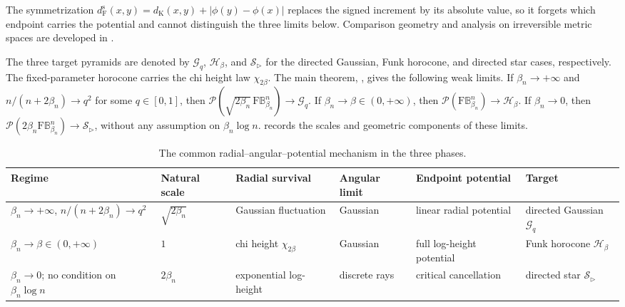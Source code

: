 \documentclass[10pt,a4paper]{amsart}
\numberwithin{equation}{section}
\newcommand{\BetaBall}{\mathrm F\mathbb B^n_{\beta_n}}
\newcommand{\Pyr}{\mathcal P}
\newcommand{\dF}{d_{\mathrm F}}
\newcommand{\dK}{d_{\mathrm K}}
\begin{document}
The symmetrization $\dF^{\mathrm s}(x,y)=\dK(x,y)+|\phi(y)-\phi(x)|$ replaces the signed increment by its absolute value, so it forgets which endpoint carries the potential and cannot distinguish the three limits below.  Comparison geometry and analysis on irreversible metric spaces are developed in \cite{ohta2021comparison,kristaly-zhao2022geometry,kristaly-ohta-zhao2025analysis}.

The three target pyramids are denoted by $\mathcal G_q$, $\mathcal H_\beta$, and $\mathcal S_{\rhd}$ for the directed Gaussian, Funk horocone, and directed star cases, respectively.  The fixed-parameter horocone carries the chi height law $\chi_{2\beta}$.  The main theorem, , gives the following weak limits.  If $\beta_n\to+\infty$ and $n/(n+2\beta_n)\to q^2$ for some $q\in[0,1]$, then $\Pyr(\sqrt{2\beta_n}\,\BetaBall)\to\mathcal G_q$.  If $\beta_n\to\beta\in(0,+\infty)$, then $\Pyr(\BetaBall)\to\mathcal H_\beta$.  If $\beta_n\to0$, then $\Pyr(2\beta_n\BetaBall)\to\mathcal S_{\rhd}$, without any assumption on $\beta_n\log n$.   records the scales and geometric components of these limits.

\begin{table}[ht]
\centering
\small
\setlength{\tabcolsep}{2pt}
\renewcommand{\arraystretch}{1.15}
\begin{tabular}{@{}p{}p{}p{}p{}p{}p{}@{}}
\toprule
\raggedright Regime & \raggedright Natural scale & \raggedright Radial survival & \raggedright Angular limit & \raggedright Endpoint potential & \raggedright Target \tabularnewline
\midrule
\raggedright $\beta_n\to+\infty$, $n/(n+2\beta_n)\to q^2$
& \raggedright $\sqrt{2\beta_n}$
& \raggedright Gaussian fluctuation
& \raggedright Gaussian
& \raggedright linear radial potential
& \raggedright directed Gaussian $\mathcal G_q$ \tabularnewline
\raggedright $\beta_n\to\beta\in(0,+\infty)$
& \raggedright $1$
& \raggedright chi height $\chi_{2\beta}$
& \raggedright Gaussian
& \raggedright full log-height potential
& \raggedright Funk horocone $\mathcal H_\beta$ \tabularnewline
\raggedright $\beta_n\to0$; no condition on $\beta_n\log n$
& \raggedright $2\beta_n$
& \raggedright exponential log-height
& \raggedright discrete rays
& \raggedright critical cancellation
& \raggedright directed star $\mathcal S_{\rhd}$ \tabularnewline
\bottomrule
\end{tabular}
\caption{The common radial--angular--potential mechanism in the three phases.}
\label{tab:phase-mechanism}
\end{table}
\end{document}
